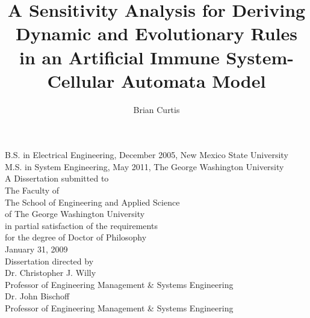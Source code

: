 \documentclass[
letterpaper,
12pt, %
doublespacing, %
headsepline, %
]{article}
\newcommand{\ttitle}{A Sensitivity Analysis for Deriving Dynamic and Evolutionary Rules in an Artificial Immune System- Cellular Automata Model}
\newcommand{\authorname}{Brian Curtis}
\begin{document}
%


\title{\singlespacing\normalsize\bf\ttitle}
\author{\normalsize\authorname{}}
\date{}
\maketitle
\thispagestyle{empty}
\begin{center}
B.S. in Electrical Engineering, December 2005, New Mexico State University \\
M.S. in System Engineering, May 2011, The George Washington University\\[\baselineskip]
A Dissertation submitted to\\[\baselineskip]
The Faculty of\\The School of Engineering and Applied Science\\ of The George
Washington University\\ in partial satisfaction of the requirements\\ for the degree
of Doctor of Philosophy\\[\baselineskip]
January 31, 2009\\[\baselineskip]
Dissertation directed by\\[\baselineskip]
Dr. Christopher J. Willy\\Professor of Engineering Management \& Systems Engineering\\[\baselineskip]
Dr. John Bischoff\\Professor of Engineering Management \& Systems Engineering\\[\baselineskip]

\end{center}
\pagestyle{plain}
\setcounter{page}{1}
\end{document}
